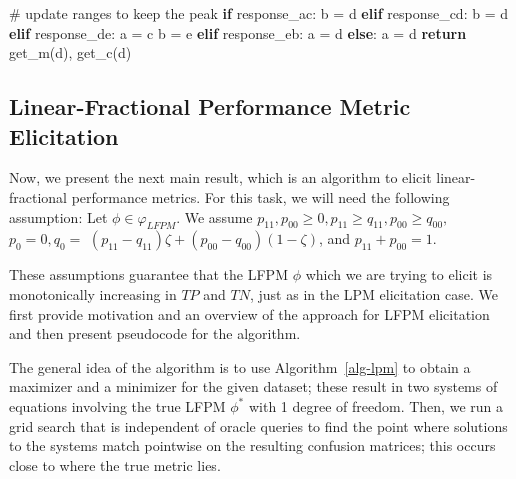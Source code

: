 \documentclass[
  letterpaper,
  numbers=noenddot,
  DIV=11]{scrreprt}
\newenvironment{Shaded}{\begin{snugshade}}{\end{snugshade}}
\newcommand{\CommentTok}[1]{\textcolor[rgb]{0.37,0.37,0.37}{#1}}
\newcommand{\ControlFlowTok}[1]{\textcolor[rgb]{0.00,0.23,0.31}{\textbf{#1}}}
\newcommand{\NormalTok}[1]{\textcolor[rgb]{0.00,0.23,0.31}{#1}}
\newcommand{\OperatorTok}[1]{\textcolor[rgb]{0.37,0.37,0.37}{#1}}
\theoremstyle{plain}
\theoremstyle{definition}
\theoremstyle{remark}
\begin{document}
\begin{tcolorbox}[colframe=.grey, title=\faCode \enspace Code]
\begin{Shaded}
\begin{Highlighting}[numbers=left,,]
        \CommentTok{\# update ranges to keep the peak}
        \ControlFlowTok{if}\NormalTok{ response\_ac:}
\NormalTok{            b }\OperatorTok{=}\NormalTok{ d}
        \ControlFlowTok{elif}\NormalTok{ response\_cd:}
\NormalTok{            b }\OperatorTok{=}\NormalTok{ d}
        \ControlFlowTok{elif}\NormalTok{ response\_de:}
\NormalTok{            a }\OperatorTok{=}\NormalTok{ c}
\NormalTok{            b }\OperatorTok{=}\NormalTok{ e}
        \ControlFlowTok{elif}\NormalTok{ response\_eb:}
\NormalTok{            a }\OperatorTok{=}\NormalTok{ d}
        \ControlFlowTok{else}\NormalTok{:}
\NormalTok{            a }\OperatorTok{=}\NormalTok{ d}
    \ControlFlowTok{return}\NormalTok{ get\_m(d), get\_c(d)}
\end{Highlighting}
\end{Shaded}

\end{tcolorbox}

\subsection{Linear-Fractional Performance Metric
Elicitation}\label{sec-lfpm-elicitation}

Now, we present the next main result, which is an algorithm to elicit
linear-fractional performance metrics. For this task, we will need the
following assumption: Let \(\phi \in \varphi_{L F P M}\). We assume
\(p_{11}, p_{00} \geq 0, p_{11} \geq q_{11}, p_{00} \geq q_{00},\)
\(p_{0}=0, q_{0}=\)
\(\left(p_{11}-q_{11}\right) \zeta+\left(p_{00}-q_{00}\right)(1-\zeta)\),
and \(p_{11}+p_{00}=1\).

These assumptions guarantee that the LFPM \(\phi\) which we are trying
to elicit is monotonically increasing in \(TP\) and \(TN\), just as in
the LPM elicitation case. We first provide motivation and an overview of
the approach for LFPM elicitation and then present pseudocode for the
algorithm.

The general idea of the algorithm is to use  Algorithm~\ref{alg-lpm}  to
obtain a maximizer and a minimizer for the given dataset; these result
in two systems of equations involving the true LFPM \(\phi^*\) with 1
degree of freedom. Then, we run a grid search that is independent of
oracle queries to find the point where solutions to the systems match
pointwise on the resulting confusion matrices; this occurs close to
where the true metric lies.
\end{document}
